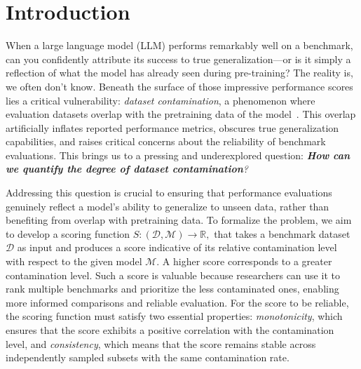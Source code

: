 \section{Introduction}
\label{sec:introduction}
When a large language model (LLM) performs remarkably well on a benchmark, can you confidently attribute its success to true generalization---or is it simply a reflection of what the model has already seen during pre-training? The reality is, we often don’t know. Beneath the surface of those impressive performance scores lies a critical vulnerability: \emph{dataset contamination}, a phenomenon where evaluation datasets overlap with the pretraining data of the model~\cite{golchintime}. This overlap artificially inflates reported performance metrics, obscures true generalization capabilities, and raises critical concerns about the reliability of benchmark evaluations. This brings us to a pressing and underexplored question: \emph{\textbf{How can we quantify the degree of dataset contamination}?} 

Addressing this question is crucial to ensuring that performance evaluations genuinely reflect a model's ability to generalize to unseen data, rather than benefiting from overlap with pretraining data. To formalize the problem, we aim to develop a scoring function $S: (\mathcal{D}, \mathcal{M}) \rightarrow \mathbb{R},$ that takes a benchmark dataset $\mathcal{D}$ as input and produces a score indicative of its relative contamination level with respect to the given model $\mathcal{M}$. A higher score corresponds to a greater contamination level. Such a score is valuable because researchers can use it to rank multiple benchmarks and prioritize the less contaminated ones, enabling more informed comparisons and reliable evaluation. For the score to be reliable, the scoring function must satisfy two essential properties:  \emph{monotonicity}, which ensures that the score exhibits a positive correlation with the contamination level, and \emph{consistency}, which means that the score remains stable across independently sampled subsets with the same contamination rate.



